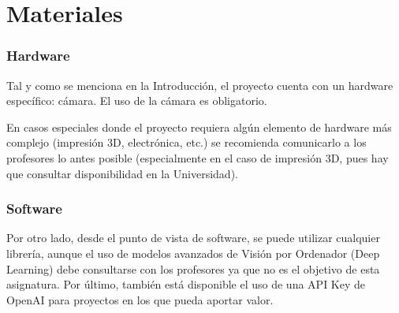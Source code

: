 \chapter{\textbf{Materiales}}
\label{chapter:materiales}

\subsection*{Hardware}
{}
\vspace{5mm}

Tal y como se menciona en la Introducción, el proyecto cuenta con un hardware específico: cámara. El uso de la cámara es obligatorio. 

En casos especiales donde el proyecto requiera algún elemento de hardware más complejo (impresión 3D, electrónica, etc.) se recomienda comunicarlo a los profesores lo antes posible (especialmente en el caso de impresión 3D, pues hay que consultar disponibilidad en la Universidad).
\subsection*{Software}
{}
\vspace{5mm}
Por otro lado, desde el punto de vista de software, se puede utilizar cualquier librería, aunque el uso de modelos avanzados de Visión por Ordenador (Deep Learning) debe consultarse con los profesores ya que no es el objetivo de esta asignatura. Por último, también está disponible el uso de una API Key de OpenAI para proyectos en los que pueda aportar valor.


